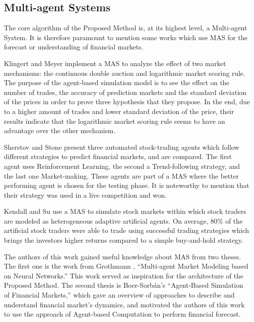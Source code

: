 \documentclass[review]{elsarticle}
\begin{document}
\subsection{Multi-agent Systems}
\label{multi-agent-systems}

The core algorithm of the Proposed Method is, at its highest level, a
Multi-agent System. It is therefore paramount to mention some works which use
MAS for the forecast or understanding of financial markets.

Klingert and Meyer \cite{Klingert_2012} implement a MAS to analyze the effect of
two market mechanisms: the continuous double auction and logarithmic market
scoring rule. The purpose of the agent-based simulation model is to see the
effect on the number of trades, the accuracy of prediction markets and the
standard deviation of the prices in order to prove three hypothesis that they
propose. In the end, due to a higher amount of trades and lower standard
deviation of the price, their results indicate that the logarithmic market
scoring rule seems to have an advantage over the other mechanism.

Sherstov and Stone \cite{Sherstov2005} present three automated stock-trading
agents which follow different strategies to predict financial markets, and are
compared. The first agent uses Reinforcement Learning, the second a
Trend-following strategy, and the last one Market-making. These agents are part
of a MAS where the better performing agent is chosen for the testing phase. It
is noteworthy to mention that their strategy was used in a live competition and
won.

Kendall and Su \cite{Kendall2003} use a MAS to simulate stock markets within
which stock traders are modeled as heterogeneous adaptive artificial agents. On
average, 80\% of the artificial stock traders were able to trade using
successful trading strategies which brings the investors higher returns compared
to a simple buy-and-hold strategy.

The authors of this work gained useful knowledge about MAS from two theses. The
first one is the work from Grothmann \cite{Grothmann2002}, ``Multi-agent Market
Modeling based on Neural Networks.'' This work served as inspiration for the
architecture of the Proposed Method. The second thesis is Boer-Sorb{\'{a}}n's
``Agent-Based Simulation of Financial Markets,'' which gave an overview of
approaches to describe and understand financial market's dynamics, and motivated
the authors of this work to use the approach of Agent-based Computation to
perform financial forecast.
\end{document}

